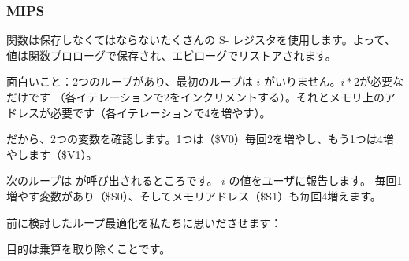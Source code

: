 ﻿\subsubsection{MIPS}

関数は保存しなくてはならないたくさんの S- レジスタを使用します。よって、
値は関数プロローグで保存され、エピローグでリストアされます。



面白いこと：2つのループがあり、最初のループは $i$ がいりません。$i*2$が必要なだけです
（各イテレーションで2をインクリメントする）。それとメモリ上のアドレスが必要です（各イテレーションで4を増やす）。

だから、2つの変数を確認します。1つは（\$V0）毎回2を増やし、もう1つは4増やします（\$V1）。

次のループは \printf が呼び出されるところです。 $i$ の値をユーザに報告します。
毎回1増やす変数があり（\$S0）、そしてメモリアドレス（\$S1）も毎回4増えます。

前に検討したループ最適化を私たちに思いださせます：

目的は乗算を取り除くことです。
